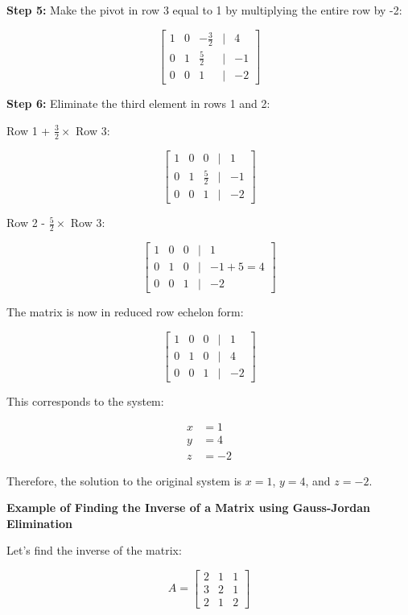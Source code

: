 \textbf{Step 5:} Make the pivot in row 3 equal to 1 by multiplying the entire row by -2:

\[
    \begin{bmatrix}
    1 & 0 & -\frac{3}{2} & | & 4 \\
    0 & 1 & \frac{5}{2} & | & -1 \\
    0 & 0 & 1 & | & -2
    \end{bmatrix}
\]

\textbf{Step 6:} Eliminate the third element in rows 1 and 2:

Row 1 + \(\frac{3}{2} \times\) Row 3:

\[
    \begin{bmatrix}
    1 & 0 & 0 & | & 1 \\
    0 & 1 & \frac{5}{2} & | & -1 \\
    0 & 0 & 1 & | & -2
    \end{bmatrix}
\]

Row 2 - \(\frac{5}{2} \times\) Row 3:

\[
    \begin{bmatrix}
    1 & 0 & 0 & | & 1 \\
    0 & 1 & 0 & | & -1 + 5 = 4 \\
    0 & 0 & 1 & | & -2
    \end{bmatrix}
\]

The matrix is now in reduced row echelon form:

\[
    \begin{bmatrix}
    1 & 0 & 0 & | & 1 \\
    0 & 1 & 0 & | & 4 \\
    0 & 0 & 1 & | & -2
    \end{bmatrix}
\]

This corresponds to the system:

\begin{align*}
    x &= 1 \\
    y &= 4 \\
    z &= -2
\end{align*}

Therefore, the solution to the original system is \(x = 1\), \(y = 4\), and \(z = -2\).

\textbf{Example of Finding the Inverse of a Matrix using Gauss-Jordan Elimination}

Let's find the inverse of the matrix:

\[
    A = 
    \begin{bmatrix}
    2 & 1 & 1 \\
    3 & 2 & 1 \\
    2 & 1 & 2
    \end{bmatrix}
\]

